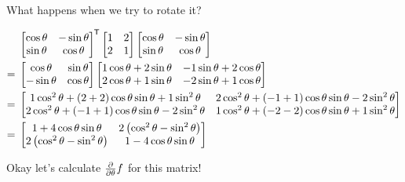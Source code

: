 \documentclass[11pt, oneside]{amsart}
\begin{document}
What happens when we try to rotate it?

\begin{equation*}
  \begin{split}
      &\begin{bmatrix}
        \cos\theta & -\sin\theta \\
        \sin\theta & \cos\theta
      \end{bmatrix}^{\mkern-1.5mu\mathsf{T}}
      \begin{bmatrix}
        1 & 2 \\
        2 & 1
      \end{bmatrix}
      \begin{bmatrix}
        \cos\theta & -\sin\theta \\
        \sin\theta & \cos\theta
      \end{bmatrix}
    \\
    ={}&
      \begin{bmatrix}
        \cos\theta  & \sin\theta \\
        -\sin\theta & \cos\theta
      \end{bmatrix}
      \begin{bmatrix}
        1\cos\theta + 2\sin\theta & -1\sin\theta + 2\cos\theta \\
        2\cos\theta + 1\sin\theta & -2\sin\theta + 1\cos\theta
      \end{bmatrix}
    \\
    ={}&
      \begin{bmatrix}
        1 \cos^2\theta + (2 + 2) \cos\theta \sin\theta + 1 \sin^2\theta
        &
        2 \cos^2\theta + (-1 + 1) \cos\theta \sin\theta - 2\sin^2\theta
        \\
        2 \cos^2\theta + (-1 + 1) \cos\theta \sin\theta - 2\sin^2\theta
        &
        1\cos^2\theta + (-2 - 2) \cos\theta\sin\theta + 1\sin^2\theta
      \end{bmatrix}
    \\
    ={}&
      \begin{bmatrix}
        1 + 4\cos\theta\sin\theta
        &
        2 \left( \cos^2\theta - \sin^2\theta \right)
        \\
        2 \left( \cos^2\theta - \sin^2\theta \right)
        &
        1 - 4\cos\theta\sin\theta
      \end{bmatrix}
    \end{split}
\end{equation*}

Okay let's calculate $\frac{\partial }{\partial \theta} f$ for this matrix!
\end{document}
